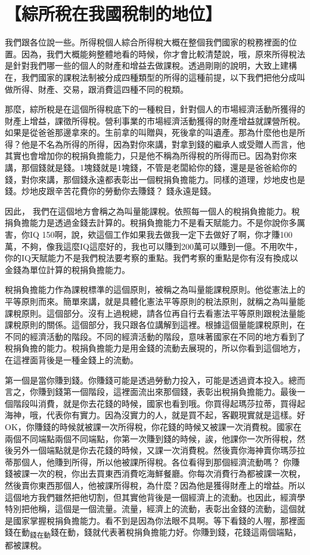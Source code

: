 \documentclass[]{ctexbook}
\begin{document}
\hypertarget{ux7d9cux6240ux7a05ux5728ux6211ux570bux7a05ux5236ux7684ux5730ux4f4d}{%
\section{【綜所稅在我國稅制的地位】}\label{ux7d9cux6240ux7a05ux5728ux6211ux570bux7a05ux5236ux7684ux5730ux4f4d}}

我們跟各位說一些。所得稅個人綜合所得稅大概在整個我們國家的稅務裡面的位置。因為，我們大概能夠整體地看的時候，你才會比較清楚說，哦，原來所得稅法是針對我們哪一些的個人的財產和增益去做課稅。透過剛剛的說明，大致上建構在，我們國家的課稅法制被分成四種類型的所得的這種前提，以下我們把他分成叫做所得、財產、交易，跟消費這四種不同的稅類。

那麼，綜所稅是在這個所得稅底下的一種稅目，針對個人的市場經濟活動所獲得的財產上增益，課徵所得稅。營利事業的市場經濟活動獲得的財產增益就課營所稅。如果是從爸爸那邊拿來的。生前拿的叫贈與，死後拿的叫遺產。那為什麼他也是所得？他是不名為所得的所得，因為對你來講，對拿到錢的繼承人或受贈人而言，他其實也會增加你的稅捐負擔能力，只是他不稱為所得稅的所得而已。因為對你來講，那個錢就是錢。1塊錢就是1塊錢，不管是老闆給你的錢，還是是爸爸給你的錢，對你來講，那個錢永遠都表彰出一個稅捐負擔能力。同樣的道理，炒地皮也是錢。炒地皮跟辛苦花費你的勞動你去賺錢？ 錢永遠是錢。

因此， 我們在這個地方會稱之為叫量能課稅。依照每一個人的稅捐負擔能力。稅捐負擔能力是透過金錢去計算的。稅捐負擔能力不是看天賦能力。不是你說你多厲害，你IQ 150啊，說，欸這個工作如果我去做我一定下去做好了啊，你才賺100萬，不夠，像我這麼IQ這麼好的，我也可以賺到200萬可以賺到一億。不用吹牛，你的IQ天賦能力不是我們稅法要考察的重點。我們考察的重點是你有沒有換成以金錢為單位計算的稅捐負擔能力。

稅捐負擔能力作為課稅標準的這個原則，被稱之為叫量能課稅原則。他從憲法上的平等原則而來。簡單來講，就是具體化憲法平等原則的稅法原則，就稱之為叫量能課稅原則。這個部分。沒有上過稅總，請各位再自行去看憲法平等原則跟稅法量能課稅原則的關係。這個部分，我只跟各位講解到這裡。根據這個量能課稅原則，在不同的經濟活動的階段。不同的經濟活動的階段，意味著國家在不同的地方看到了稅捐負擔的能力。稅捐負擔能力是用金錢的流動去展現的，所以你看到這個地方，在這裡面背後是一種金錢上的流動。

第一個是當你賺到錢。你賺錢可能是透過勞動力投入，可能是透過資本投入。總而言之，你賺到錢第一個階段，這裡面流出來那個錢，表彰出稅捐負擔能力。最後一個階段叫消費，就是你去花錢的時候，國家也看到哦。你買得起瑪莎拉蒂，買得起海神，哦，代表你有實力。因為沒實力的人，就是買不起，客觀現實就是這樣。好OK，你賺錢的時候就被課一次所得稅，你花錢的時候又被課一次消費稅。國家在兩個不同端點兩個不同端點，你第一次賺到錢的時候，誒，他課你一次所得稅，然後另外一個端點就是你去花錢的時候，又課一次消費稅。然後賣你海神賣你瑪莎拉蒂那個人，他賺到所得，所以他被課所得稅。各位看得到那個經濟流動嗎？ 你賺錢被課一次的稅，你出去買東西消費吃海鮮餐廳。你每次消費行為都被課一次稅，然後賣你東西那個人，他被課所得稅，為什麼？因為他是獲得財產上的增益。所以這個地方我們雖然把他切割，但其實他背後是一個經濟上的流動。也因此，經濟學特別把他稱，這個是一個流量。流量，經濟上的流動，表彰出金錢的流動，這個就是國家掌握稅捐負擔能力。看不到是因為你法眼不具啊。等下看錢的人喔，那裡面錢在動\textsubscript{錢在動}錢在動，錢就代表著稅捐負擔能力好。你賺到錢，花錢這兩個端點，都被課稅。
\end{document}
